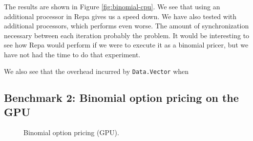 The results are shown in Figure \ref{fig:binomial-cpu}. We see that
using an additional processor in Repa gives us a speed down. We have
also tested with additional processors, which performs even worse. The
amount of synchronization necessary between each iteration probably
the problem. It would be interesting to see how Repa would perform if
we were to execute it as a binomial pricer, but we have not had the
time to do that experiment.

We also see that the overhead incurred by \texttt{Data.Vector} when



\subsection{Benchmark 2: Binomial option pricing on the GPU}
\begin{figure}
	\centering
\begin{adjustbox}{minipage=1.3\textwidth,margin=0pt \smallskipamount,center}
\end{adjustbox}
  \caption{Binomial option pricing (GPU).}
\label{fig:binomial-gpu}
\end{figure}

